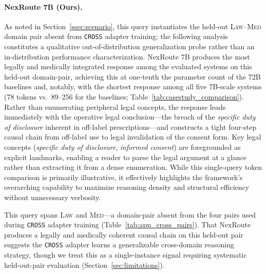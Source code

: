 \documentclass[a4paper,fleql]{cas-sc}
\begin{document}
\paragraph{NexRoute 7B (Ours).}
As noted in Section~\ref{ssec:scenario}, this query instantiates the held-out
\textsc{Law}--\textsc{Med} domain pair absent from \texttt{CROSS} adapter
training; the following analysis constitutes a qualitative out-of-distribution
generalization probe rather than an in-distribution performance characterization.
NexRoute 7B produces the most legally and medically integrated response among
the evaluated systems on this held-out domain-pair, achieving this at one-tenth
the parameter count of the 72B baselines and, notably, with the shortest response
among all five 7B-scale systems (78 tokens vs.\ 89--256 for the baselines;
Table~\ref{tab:casestudy_comparison}).
Rather than enumerating peripheral legal concepts, the response leads
immediately with the operative legal conclusion---the breach of the
\textit{specific duty of disclosure} inherent in off-label prescriptions---and
constructs a tight four-step causal chain from off-label use to legal
invalidation of the consent form. Key legal concepts (\textit{specific duty
of disclosure}, \textit{informed consent}) are foregrounded as explicit
landmarks, enabling a reader to parse the legal argument at a glance rather
than extracting it from a dense enumeration. While this single-query token
comparison is primarily illustrative, it effectively highlights the framework's
overarching capability to maximize reasoning density and structural efficiency
without unnecessary verbosity.

This query spans \textsc{Law} and \textsc{Med}---a domain-pair absent from
the four pairs used during \texttt{CROSS} adapter training
(Table~\ref{tab:app_cross_pairs}). That NexRoute produces a legally and
medically coherent causal chain on this held-out pair suggests the
\texttt{CROSS} adapter learns a generalizable cross-domain reasoning strategy,
though we treat this as a single-instance signal requiring systematic
held-out-pair evaluation (Section~\ref{sec:limitations}).
\end{document}
